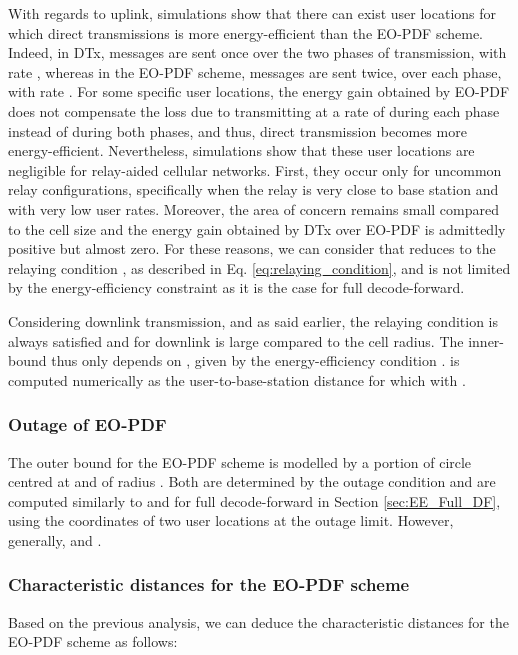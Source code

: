 \documentclass[journal]{IEEEtran}
\theoremstyle{definition}
\begin{document}
With regards to uplink, simulations show that there can exist user locations for which direct transmissions is more energy-efficient than the EO-PDF scheme. Indeed, in DTx, messages are sent once over the two phases of transmission, with rate , whereas in the EO-PDF scheme, messages are sent twice, over each phase, with rate . For some specific user locations, the energy gain obtained by EO-PDF does not compensate the loss due to transmitting at a rate of  during each phase instead of  during both phases, and thus, direct transmission becomes more energy-efficient.
Nevertheless, simulations show that these user locations are negligible for relay-aided cellular networks. First, they occur only for uncommon relay configurations, specifically when the relay is very close to base station and with very low user rates. Moreover, the area of concern remains small compared to the cell size and the energy gain obtained by DTx over EO-PDF is admittedly positive but almost zero. For these reasons, we can consider that  reduces to the relaying condition , as described in Eq. \eqref{eq:relaying_condition}, and is not limited by the energy-efficiency constraint as it is the case for full decode-forward.

Considering downlink transmission, and as said earlier, the relaying condition  is always satisfied and  for downlink is large compared to the cell radius. The inner-bound  thus only depends on , given by the energy-efficiency condition .   is computed numerically as the user-to-base-station distance for which  with .



\subsubsection{Outage of EO-PDF}

The outer bound for the EO-PDF scheme is modelled by a portion of circle centred at  and of radius . Both are determined by the outage condition and are computed similarly to  and  for full decode-forward in Section \ref{sec:EE_Full_DF}, using the coordinates of two user locations at the outage limit. However, generally,  and .

\subsubsection{Characteristic distances for the EO-PDF scheme}

Based on the previous analysis, we can deduce the characteristic distances for the EO-PDF scheme as follows:
\end{document}
